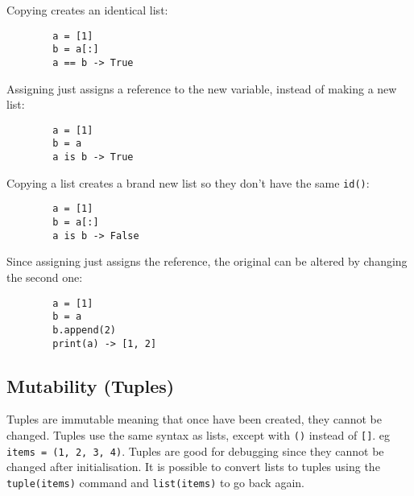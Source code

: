 \noindent
Copying creates an identical list:

\begin{center}
    \begin{verbatim}
        a = [1]
        b = a[:]
        a == b -> True
    \end{verbatim}
\end{center}

\noindent
Assigning just assigns a reference to the new variable, instead of making a new list:

\begin{center}
    \begin{verbatim}
        a = [1]
        b = a
        a is b -> True
    \end{verbatim}
\end{center}

\noindent
Copying a list creates a brand new list so they don't have the same \texttt{id()}:

\begin{center}
    \begin{verbatim}
        a = [1]
        b = a[:]
        a is b -> False
    \end{verbatim}
\end{center}

\noindent
Since assigning just assigns the reference, the original can be altered by changing the second one:

\begin{center}
    \begin{verbatim}
        a = [1]
        b = a
        b.append(2)
        print(a) -> [1, 2]
    \end{verbatim}
\end{center}

\subsection{Mutability (Tuples)}\label{sub:mutability_tuples_}

Tuples are immutable meaning that once have been created, they cannot be changed.
Tuples use the same syntax as lists, except with \texttt{()} instead of \texttt{[]}. eg \texttt{items = (1, 2, 3, 4)}.
Tuples are good for debugging since they cannot be changed after initialisation.
It is possible to convert lists to tuples using the \texttt{tuple(items)} command and \texttt{list(items)} to go back again.

